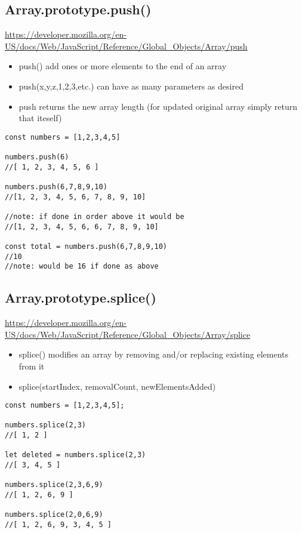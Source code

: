 \documentclass[10pt]{article}
\begin{document}
\medskip %
\pagebreak
\subsection{Array.prototype.push()}

\url{https://developer.mozilla.org/en-US/docs/Web/JavaScript/Reference/Global_Objects/Array/push}

\begin{itemize}
	\item push() add ones or more elements to the end of an array
	\item push(x,y,z,1,2,3,etc.) can have as many parameters as desired
	\item push returns the new array length (for updated original array simply return that iteself)
\end{itemize}

	
\begin{lstlisting}[title=Example push(), captionpos=t]
const numbers = [1,2,3,4,5]

numbers.push(6)
//[ 1, 2, 3, 4, 5, 6 ]

numbers.push(6,7,8,9,10)
//[1, 2, 3, 4, 5, 6, 7, 8, 9, 10]

//note: if done in order above it would be 
//[1, 2, 3, 4, 5, 6, 6, 7, 8, 9, 10]

const total = numbers.push(6,7,8,9,10)
//10
//note: would be 16 if done as above 
\end{lstlisting}
\medskip %



\medskip %
\pagebreak
\subsection{Array.prototype.splice()}

\url{https://developer.mozilla.org/en-US/docs/Web/JavaScript/Reference/Global_Objects/Array/splice}

\begin{itemize}
	\item splice() modifies an array by removing and/or replacing existing elements from it
	\item splice(startIndex, removalCount, newElementsAdded)
\end{itemize}

	
\begin{lstlisting}[title=Example splice(), captionpos=t]
const numbers = [1,2,3,4,5];

numbers.splice(2,3)
//[ 1, 2 ]

let deleted = numbers.splice(2,3)
//[ 3, 4, 5 ]

numbers.splice(2,3,6,9)
//[ 1, 2, 6, 9 ]

numbers.splice(2,0,6,9)
//[ 1, 2, 6, 9, 3, 4, 5 ]
\end{lstlisting}
\medskip %
\end{document}
